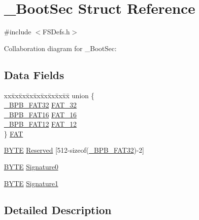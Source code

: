 \hypertarget{struct___boot_sec}{}\section{\+\_\+\+Boot\+Sec Struct Reference}
\label{struct___boot_sec}


{\ttfamily \#include $<$F\+S\+Defs.\+h$>$}



Collaboration diagram for \+\_\+\+Boot\+Sec\+:
\subsection*{Data Fields}
\begin{DoxyCompactItemize}
\item 
\begin{tabbing}
xx\=xx\=xx\=xx\=xx\=xx\=xx\=xx\=xx\=\kill
union \{\\
\>\hyperlink{struct___b_p_b___f_a_t32}{\_BPB\_FAT32} \hyperlink{struct___boot_sec_a8624001f392eee972fd2f43f56b070f4}{FAT\_32}\\
\>\hyperlink{struct___b_p_b___f_a_t16}{\_BPB\_FAT16} \hyperlink{struct___boot_sec_a6b281272492ad45df204481e61ab5ddf}{FAT\_16}\\
\>\hyperlink{struct___b_p_b___f_a_t12}{\_BPB\_FAT12} \hyperlink{struct___boot_sec_ad60e9ec565f9ff89e316d06a1beeaa48}{FAT\_12}\\
\} \hyperlink{struct___boot_sec_ab71fec07fbc13e462442090c30d0eb06}{FAT}\\

\end{tabbing}\item 
\hyperlink{_generic_type_defs_8h_a4ae1dab0fb4b072a66584546209e7d58}{B\+Y\+T\+E} \hyperlink{struct___boot_sec_a7dfb0035d3c79ff7468ec857339c9b60}{Reserved} \mbox{[}512-\/sizeof(\hyperlink{struct___b_p_b___f_a_t32}{\+\_\+\+B\+P\+B\+\_\+\+F\+A\+T32})-\/2\mbox{]}
\item 
\hyperlink{_generic_type_defs_8h_a4ae1dab0fb4b072a66584546209e7d58}{B\+Y\+T\+E} \hyperlink{struct___boot_sec_a9b49d812a9060bf0b318a52865b75d7c}{Signature0}
\item 
\hyperlink{_generic_type_defs_8h_a4ae1dab0fb4b072a66584546209e7d58}{B\+Y\+T\+E} \hyperlink{struct___boot_sec_a39b5beb9c358d4403630e620e017d601}{Signature1}
\end{DoxyCompactItemize}


\subsection{Detailed Description}


